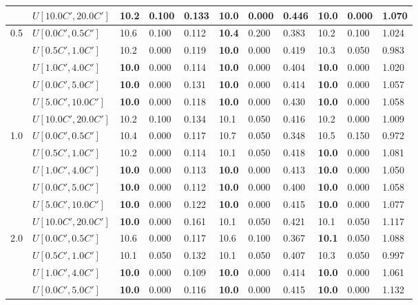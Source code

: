 \begin{table}[h]
{\begin{tabular}{|l|l||l|l|l||l|l|l||l|l|l|}
       & $U[10.0C',20.0C']$ & 10.2 & 0.100 & 0.133 & \textbf{10.0} & 0.000 & 0.446 & \textbf{10.0} & 0.000 & 1.070 \\
      \hline\hline
      \multirow{6}{*}{0.5} & $U[0.0C',0.5C']$ & 10.6 & 0.100 & 0.112 & \textbf{10.4} & 0.200 & 0.383 & 10.2 & 0.100 & 1.024 \\
       & $U[0.5C',1.0C']$ & 10.2 & 0.000 & 0.119 & \textbf{10.0} & 0.000 & 0.419 & 10.3 & 0.050 & 0.983 \\
       & $U[1.0C',4.0C']$ & \textbf{10.0} & 0.000 & 0.114 & \textbf{10.0} & 0.000 & 0.404 & \textbf{10.0} & 0.000 & 1.020 \\
       & $U[0.0C',5.0C']$ & \textbf{10.0} & 0.000 & 0.131 & \textbf{10.0} & 0.000 & 0.414 & \textbf{10.0} & 0.000 & 1.057 \\
       & $U[5.0C',10.0C']$ & \textbf{10.0} & 0.000 & 0.118 & \textbf{10.0} & 0.000 & 0.430 & \textbf{10.0} & 0.000 & 1.058 \\
       & $U[10.0C',20.0C']$ & 10.2 & 0.100 & 0.134 & 10.1 & 0.050 & 0.416 & 10.2 & 0.000 & 1.009 \\
      \hline\hline
      \multirow{6}{*}{1.0} & $U[0.0C',0.5C']$ & 10.4 & 0.000 & 0.117 & 10.7 & 0.050 & 0.348 & 10.5 & 0.150 & 0.972 \\
       & $U[0.5C',1.0C']$ & 10.2 & 0.000 & 0.114 & 10.1 & 0.050 & 0.418 & \textbf{10.0} & 0.000 & 1.081 \\
       & $U[1.0C',4.0C']$ & \textbf{10.0} & 0.000 & 0.113 & \textbf{10.0} & 0.000 & 0.413 & \textbf{10.0} & 0.000 & 1.050 \\
       & $U[0.0C',5.0C']$ & \textbf{10.0} & 0.000 & 0.112 & \textbf{10.0} & 0.000 & 0.400 & \textbf{10.0} & 0.000 & 1.058 \\
       & $U[5.0C',10.0C']$ & \textbf{10.0} & 0.000 & 0.122 & \textbf{10.0} & 0.000 & 0.415 & \textbf{10.0} & 0.000 & 1.077 \\
       & $U[10.0C',20.0C']$ & \textbf{10.0} & 0.000 & 0.161 & 10.1 & 0.050 & 0.421 & 10.1 & 0.050 & 1.117 \\
      \hline\hline
      \multirow{6}{*}{2.0} & $U[0.0C',0.5C']$ & 10.6 & 0.000 & 0.117 & 10.6 & 0.100 & 0.367 & \textbf{10.1} & 0.050 & 1.088 \\
       & $U[0.5C',1.0C']$ & 10.1 & 0.050 & 0.132 & 10.1 & 0.050 & 0.407 & 10.3 & 0.050 & 0.997 \\
       & $U[1.0C',4.0C']$ & \textbf{10.0} & 0.000 & 0.109 & \textbf{10.0} & 0.000 & 0.414 & \textbf{10.0} & 0.000 & 1.061 \\
       & $U[0.0C',5.0C']$ & \textbf{10.0} & 0.000 & 0.116 & \textbf{10.0} & 0.000 & 0.415 & \textbf{10.0} & 0.000 & 1.132 \\

\end{tabular}}
\end{table}
